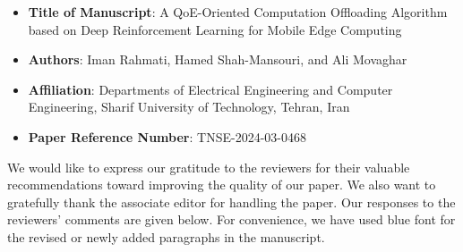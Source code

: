 \documentclass[12pt,draftclsnofoot,onecolumn]{IEEEtran}
\begin{document}
\begin{itemize}
	\item \textbf{Title of Manuscript}: A QoE-Oriented Computation Offloading Algorithm based on Deep Reinforcement Learning for Mobile Edge Computing
	
	
	\item \textbf{Authors}:  Iman Rahmati, Hamed Shah-Mansouri, and Ali Movaghar
	
	
	\item \textbf{Affiliation}: Departments of Electrical Engineering and Computer Engineering,  Sharif University of Technology, Tehran, Iran
	
	\item \textbf{Paper Reference Number}: TNSE-2024-03-0468 
	
\end{itemize}

\vspace{0.3cm}


\noindent We would like to express our gratitude to the reviewers for their valuable recommendations toward improving the quality of our paper. We also want to gratefully thank the associate editor for handling the paper. Our responses to the reviewers' comments are given below. For convenience, we have used blue font for the revised or newly added paragraphs in the manuscript.\newline

\setcounter{section}{0}
\renewcommand*{\thesection}{\Roman{section}}
\makeatletter


\newpage
\end{document}
